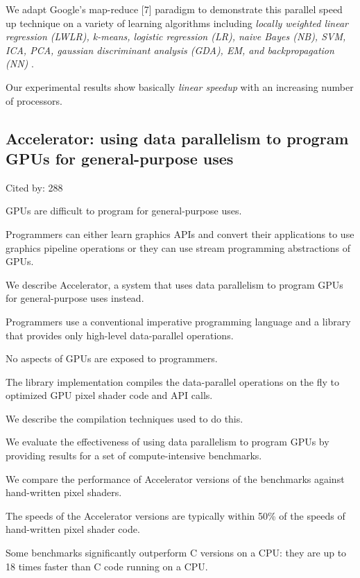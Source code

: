 \documentclass[a4paper,11pt]{article}
\begin{document}
{{{We adapt Google's map-reduce [7] paradigm to demonstrate this parallel speed up technique 
on a variety of learning algorithms including 
{\em
locally weighted linear regression (LWLR), 
k-means, 
logistic regression (LR), 
naive Bayes (NB), 
SVM, ICA, PCA, 
gaussian discriminant analysis (GDA), 
EM, and 
backpropagation (NN)
}. 

Our experimental results show basically 
{\em linear speedup} 
with an increasing number of processors.	

}


\subsection*{Accelerator: using data parallelism to program GPUs for general-purpose uses}
{\color{cyan} {\color{magenta} Cited by: 288}

GPUs are difficult to program for general-purpose uses. 

Programmers can either learn graphics APIs and convert their applications to use graphics pipeline operations 
or they can use stream programming abstractions of GPUs.

We describe 
{\color{black} Accelerator\cite{accelerator}}, 
a system that uses data parallelism to program GPUs for general-purpose uses instead. 

Programmers use 
a conventional imperative programming language and 
a library that provides only high-level data-parallel operations. 

No aspects of GPUs are exposed to programmers. 

The library implementation compiles the data-parallel operations on the fly 
to optimized GPU pixel shader code and API calls.

We describe the compilation techniques used to do this. 

We evaluate the effectiveness of using data parallelism to program GPUs 
by providing results for a set of compute-intensive benchmarks. 

We 
compare the performance of Accelerator versions of the benchmarks 
against hand-written pixel shaders. 

The speeds of the Accelerator versions are typically 
within 50\% of the speeds of hand-written pixel shader code. 

Some benchmarks significantly outperform C versions on a CPU: 
they are up to 18 times faster than C code running on a CPU.

}


}}
\end{document}
